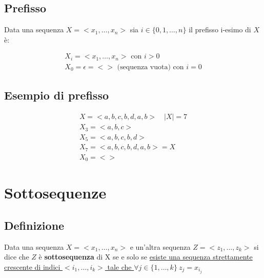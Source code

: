         \subsection{Prefisso}
        Data una sequenza $X = <x_1, \dots, x_n>$ sia $i \in \{0,1,\dots,n\}$ il prefisso i-esimo di $X$ è:
        {
            \Large
        
            \begin{gather*}
                X_i = <x_1, \dots, x_n> \text{ con } i>0 \\
                X_0 = \epsilon = <> \text{ (sequenza vuota) con }i=0
            \end{gather*}
        }

        \subsection{Esempio di prefisso}
        {
            \Large

            \begin{gather*}
                X = <a,b,c,b,d,a,b> \quad |X| = 7 \\
                X_3 = <a,b,c> \\
                X_5 = <a,b,c,b,d> \\
                X_7 = <a,b,c,b,d,a,b> = X \\
                X_0 = <>
            \end{gather*}
        }
        

    \section{Sottosequenze}
        \subsection{Definizione}
        Data una sequenza $X=<x_1, \dots, x_n>$ e un'altra sequenza $Z=<z_1, \dots, z_k>$ si dice che $Z$ è \textbf{sottosequenza} di X se e solo se \uline{esiste una sequenza strettamente crescente di indici $<i_1, \dots, i_k>$ tale che $\forall j \in \{1, \dots, k\}\ z_j = x_{i_{j}}$} 

